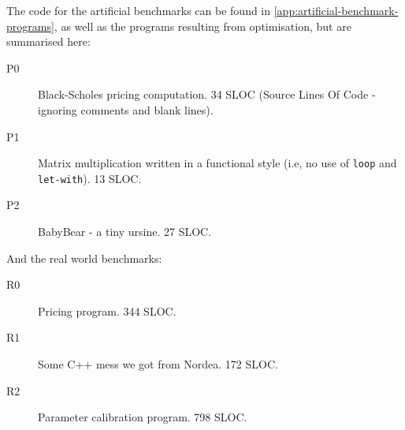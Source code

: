 The code for the artificial benchmarks can be found in
\cref{app:artificial-benchmark-programs}, as well as the programs
resulting from optimisation, but are summarised here:

\begin{description}
\item[P0] Black-Scholes\cite{black1973pricing} pricing computation.
  34 SLOC (Source Lines Of Code - ignoring comments and blank lines).

\item[P1] Matrix multiplication written in a functional style (i.e, no
  use of \texttt{loop} and \texttt{let-with}).  13 SLOC.

\item[P2] BabyBear - a tiny ursine.  27 SLOC.
\end{description}

And the real world benchmarks:

\begin{description}
\item[R0] Pricing program.  344 SLOC.

\item[R1] Some C++ mess we got from Nordea.  172 SLOC.

\item[R2] Parameter calibration program.  798 SLOC.

\end{description}

